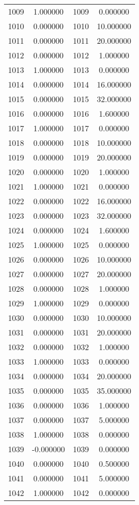\documentclass[12pt]{article}
\begin{document}
\begin{longtable}{@{}cccc@{}}
1009 & 1.000000 & 1009 & 0.000000 \\
1010 & 0.000000 & 1010 & 10.000000 \\
1011 & 0.000000 & 1011 & 20.000000 \\
1012 & 0.000000 & 1012 & 1.000000 \\
1013 & 1.000000 & 1013 & 0.000000 \\
1014 & 0.000000 & 1014 & 16.000000 \\
1015 & 0.000000 & 1015 & 32.000000 \\
1016 & 0.000000 & 1016 & 1.600000 \\
1017 & 1.000000 & 1017 & 0.000000 \\
1018 & 0.000000 & 1018 & 10.000000 \\
1019 & 0.000000 & 1019 & 20.000000 \\
1020 & 0.000000 & 1020 & 1.000000 \\
1021 & 1.000000 & 1021 & 0.000000 \\
1022 & 0.000000 & 1022 & 16.000000 \\
1023 & 0.000000 & 1023 & 32.000000 \\
1024 & 0.000000 & 1024 & 1.600000 \\
1025 & 1.000000 & 1025 & 0.000000 \\
1026 & 0.000000 & 1026 & 10.000000 \\
1027 & 0.000000 & 1027 & 20.000000 \\
1028 & 0.000000 & 1028 & 1.000000 \\
1029 & 1.000000 & 1029 & 0.000000 \\
1030 & 0.000000 & 1030 & 10.000000 \\
1031 & 0.000000 & 1031 & 20.000000 \\
1032 & 0.000000 & 1032 & 1.000000 \\
1033 & 1.000000 & 1033 & 0.000000 \\
1034 & 0.000000 & 1034 & 20.000000 \\
1035 & 0.000000 & 1035 & 35.000000 \\
1036 & 0.000000 & 1036 & 1.000000 \\
1037 & 0.000000 & 1037 & 5.000000 \\
1038 & 1.000000 & 1038 & 0.000000 \\
1039 & -0.000000 & 1039 & 0.000000 \\
1040 & 0.000000 & 1040 & 0.500000 \\
1041 & 0.000000 & 1041 & 5.000000 \\
1042 & 1.000000 & 1042 & 0.000000 \\

\end{longtable}
\end{document}

